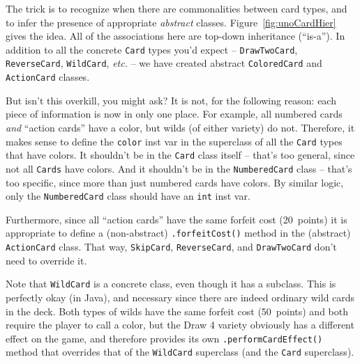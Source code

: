 
The trick is to recognize when there are commonalities between card types, and
to infer the presence of appropriate \textit{abstract} classes.
Figure~\ref{fig:unoCardHier} gives the idea. All of the associations here are
top-down inheritance (``is-a''). In addition to all the concrete \texttt{Card}
types you'd expect -- \texttt{DrawTwoCard}, \texttt{ReverseCard},
\texttt{WildCard}, \textit{etc.} -- we have created abstract
\texttt{ColoredCard} and \texttt{ActionCard} classes.

But isn't this overkill, you might ask? It is not, for the following reason:
each piece of information is now in only one place. For example, all numbered
cards \textit{and} ``action cards'' have a color, but wilds (of either variety)
do not. Therefore, it makes sense to define the \texttt{color} inst var in the
superclass of all the \texttt{Card} types that have colors. It shouldn't be in
the \texttt{Card} class itself -- that's too general, since not all
\texttt{Cards} have colors. And it shouldn't be in the \texttt{NumberedCard}
class -- that's too specific, since more than just numbered cards have colors.
By similar logic, only the \texttt{NumberedCard} class should have an
\texttt{int} inst var.


Furthermore, since all ``action cards'' have the same forfeit cost (20~points)
it is appropriate to define a (non-abstract) \texttt{.forfeitCost()} method in
the (abstract) \texttt{ActionCard} class. That way, \texttt{SkipCard},
\texttt{ReverseCard}, and \texttt{DrawTwoCard} don't need to override it.


Note that \texttt{WildCard} is a concrete class, even though it has a subclass.
This is perfectly okay (in Java), and necessary since there are indeed ordinary
wild cards in the deck. Both types of wilds have the same forfeit cost
(50~points) and both require the player to call a color, but the Draw 4 variety
obviously has a different effect on the game, and therefore provides its own
\texttt{.performCardEffect()} method that overrides that of the
\texttt{WildCard} superclass (and the \texttt{Card} superclass).


